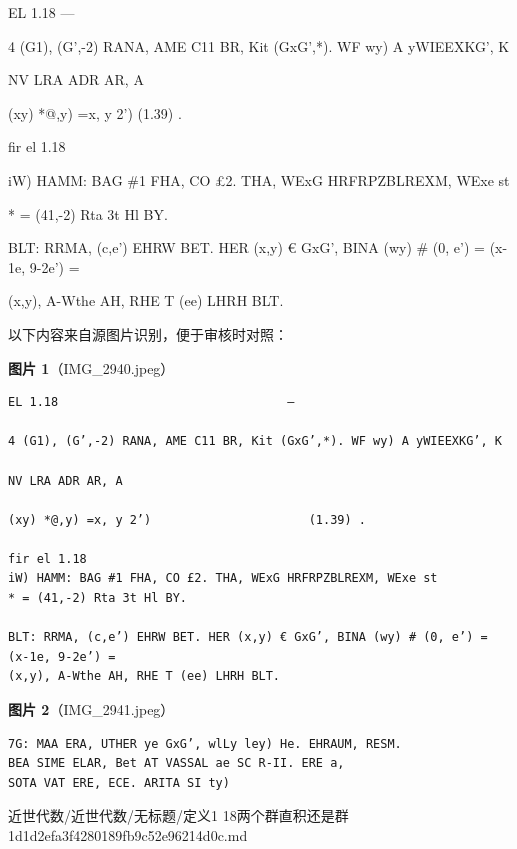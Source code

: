 \begin{definition}[定义1.18两个群直积还是群]

EL 1.18                                —

4 (G1), (G’,-2) RANA, AME C11 BR, Kit (GxG’,*). WF wy) A yWIEEXKG’, K

NV LRA ADR AR, A

(xy) *@,y) =x, y 2’)                      (1.39) .

fir el 1.18

iW) HAMM: BAG \#1 FHA, CO £2. THA, WExG HRFRPZBLREXM, WExe st

* = (41,-2) Rta 3t Hl BY.

BLT: RRMA, (c,e’) EHRW BET. HER (x,y) € GxG’, BINA (wy) \# (0, e’) = (x-1e, 9-2e’) =

(x,y), A-Wthe AH, RHE T (ee) LHRH BLT.

\end{definition}

\begin{note}
以下内容来自源图片识别，便于审核时对照：

\textbf{图片 1}（IMG\_2940.jpeg）
\begin{Verbatim}[fontsize=\small]
EL 1.18                                —

4 (G1), (G’,-2) RANA, AME C11 BR, Kit (GxG’,*). WF wy) A yWIEEXKG’, K

NV LRA ADR AR, A

(xy) *@,y) =x, y 2’)                      (1.39) .

fir el 1.18
iW) HAMM: BAG #1 FHA, CO £2. THA, WExG HRFRPZBLREXM, WExe st
* = (41,-2) Rta 3t Hl BY.

BLT: RRMA, (c,e’) EHRW BET. HER (x,y) € GxG’, BINA (wy) # (0, e’) = (x-1e, 9-2e’) =
(x,y), A-Wthe AH, RHE T (ee) LHRH BLT.
\end{Verbatim}

\textbf{图片 2}（IMG\_2941.jpeg）
\begin{Verbatim}[fontsize=\small]
7G: MAA ERA, UTHER ye GxG’, wlLy ley) He. EHRAUM, RESM.
BEA SIME ELAR, Bet AT VASSAL ae SC R-II. ERE a,
SOTA VAT ERE, ECE. ARITA SI ty)
\end{Verbatim}

\end{note}

\begin{note}[来源路径]

近世代数/近世代数/无标题/定义1 18两个群直积还是群 1d1d2efa3f4280189fb9c52e96214d0c.md

\end{note}

